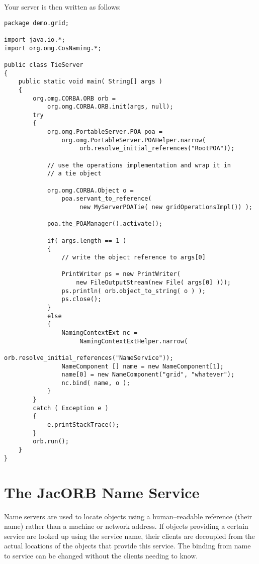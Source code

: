 \documentclass[12pt]{scrbook}
\begin{document}
Your server is then written as follows:

\begin{verbatim}
package demo.grid;

import java.io.*;
import org.omg.CosNaming.*;

public class TieServer
{
    public static void main( String[] args )
    {
        org.omg.CORBA.ORB orb =
            org.omg.CORBA.ORB.init(args, null);
        try
        {
            org.omg.PortableServer.POA poa =
                org.omg.PortableServer.POAHelper.narrow(
                     orb.resolve_initial_references("RootPOA"));

            // use the operations implementation and wrap it in
            // a tie object

            org.omg.CORBA.Object o =
                poa.servant_to_reference(
                     new MyServerPOATie( new gridOperationsImpl()) );

            poa.the_POAManager().activate();

            if( args.length == 1 )
            {
                // write the object reference to args[0]

                PrintWriter ps = new PrintWriter(
                    new FileOutputStream(new File( args[0] )));
                ps.println( orb.object_to_string( o ) );
                ps.close();
            }
            else
            {
                NamingContextExt nc =
                     NamingContextExtHelper.narrow(
                        orb.resolve_initial_references("NameService"));
                NameComponent [] name = new NameComponent[1];
                name[0] = new NameComponent("grid", "whatever");
                nc.bind( name, o );
            }
        }
        catch ( Exception e )
        {
            e.printStackTrace();
        }
        orb.run();
    }
}
\end{verbatim}





\chapter{The JacORB Name Service}
\label{names}

Name  servers  are used  to  locate  objects  using a  human--readable
reference (their  name) rather than  a machine or network  address. If
objects providing  a certain service  are looked up using  the service
name, their  clients are  decoupled from the  actual locations  of the
objects that provide  this service.  The binding from  name to service
can be changed without the clients needing to know.
\end{document}
